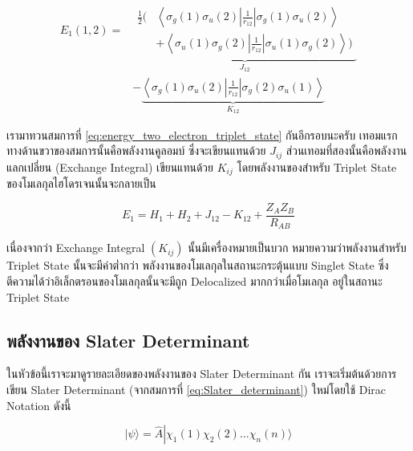 \begin{equation}
  \label{eq:energy_two_electron_triplet_state}
  \begin{aligned}
    E_1(1,2)
    = &
    \underbrace{
      \begin{aligned}
        \frac{1}{2}
        \biggl(
         & \left\langle\sigma_g(1) \sigma_u(2)
        \left|\frac{1}{r_{12}}\right|
        \sigma_g(1) \sigma_u(2)\right\rangle     \\
         & + \left\langle\sigma_u(1) \sigma_g(2)
        \left|\frac{1}{r_{12}}\right|
        \sigma_u(1) \sigma_g(2)\right\rangle
        \biggl)
      \end{aligned}
    }_{J_{12}}        \\
      & -\underbrace{
      \left\langle\sigma_g(1) \sigma_u(2)
      \left|\frac{1}{r_{12}}\right|
      \sigma_g(2) \sigma_u(1)\right\rangle}
    _{K_{12}}
  \end{aligned}
\end{equation}

เรามาทวนสมการที่ \eqref{eq:energy_two_electron_triplet_state} กันอีกรอบนะครับ เทอมแรกทางด้านขวาของสมการนั้นคือพลังงานคูลอมบ์%
ซึ่งจะเขียนแทนด้วย $J_{i j}$ ส่วนเทอมที่สองนั้นคือพลังงานแลกเปลี่ยน (Exchange Integral) เขียนแทนด้วย $K_{i j}$ โดยพลังงานของสำหรับ
Triplet State ของโมเลกุลไฮโดรเจนนั้นจะกลายเป็น

\begin{equation}
  E_1
  =
  H_1 + H_2 + J_{12} - K_{12} + \frac{Z_A Z_B}{R_{A B}}
\end{equation}

เนื่องจากว่า Exchange Integral $(K_{i j})$ นั้นมีเครื่องหมายเป็นบวก หมายความว่าพลังงานสำหรับ Triplet State นั้นจะมีค่าต่ำกว่า%
พลังงานของโมเลกุลในสถานะกระตุ้นแบบ Singlet State ซึ่งตีความได้ว่าอิเล็กตรอนของโมเลกุลนั้นจะมีถูก Delocalized มากกว่าเมื่อโมเลกุล%
อยู่ในสถานะ Triplet State

\subsection{พลังงานของ Slater Determinant}

ในหัวข้อนี้เราจะมาดูรายละเอียดของพลังงานของ Slater Determinant กัน เราจะเริ่มต้นด้วยการเขียน Slater Determinant (จากสมการที่
\eqref{eq:Slater_determinant}) ใหม่โดยใช้ Dirac Notation ดังนี้

\begin{equation}
  \label{eq:Slater_determinant_simple}
  |\psi\rangle
  =
  \hat{A} \left|\right. \chi_1(1) \chi_2(2) \ldots \chi_n(n)\bigr\rangle
\end{equation}

